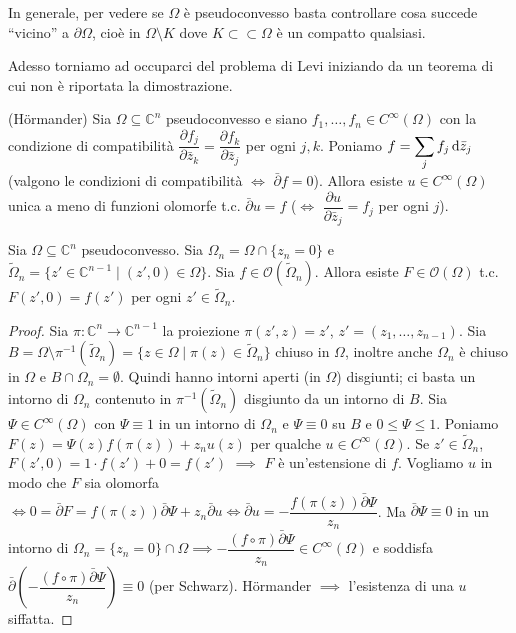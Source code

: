 \begin{oss}
  In generale, per vedere se $\Omega$ è pseudoconvesso basta controllare cosa succede ``vicino'' a $\partial\Omega$, cioè in $\Omega \setminus K$ dove $K \subset\subset \Omega$ è un compatto qualsiasi.
\end{oss}

Adesso torniamo ad occuparci del problema di Levi iniziando da un teorema di cui non è riportata la dimostrazione.

\begin{thm}
  (Hörmander) Sia $\Omega \subseteq \mathbb{C}^n$ pseudoconvesso e siano $f_1,\dots,f_n \in C^{\infty}(\Omega)$ con la condizione di compatibilità $\dfrac{\partial f_j}{\partial\bar{z}_k}=\dfrac{\partial f_k}{\partial\bar{z}_j}$ per ogni $j,k$. Poniamo $\displaystyle f=\sum_j f_j\mathop{}\!\mathrm{d}\bar{z}_j$ (valgono le condizioni di compatibilità $\iff$ $\bar{\partial}f=0$).
  Allora esiste $u \in C^{\infty}(\Omega)$ unica a meno di funzioni olomorfe t.c. $\bar{\partial}u=f$ ($\iff$ $\dfrac{\partial u}{\partial\bar{z}_j}=f_j$ per ogni $j$).
\end{thm}

\begin{thm} \label{hormanderino}
  Sia $\Omega \subseteq \mathbb{C}^n$ pseudoconvesso. Sia $\Omega_n=\Omega \cap \{z_n=0\}$ e $\tilde{\Omega}_n=\{z' \in \mathbb{C}^{n-1} \mid (z',0) \in \Omega\}$. Sia $f \in \mathcal{O}(\tilde{\Omega}_n)$.
  Allora esiste $F \in \mathcal{O}(\Omega)$ t.c. $F(z',0)=f(z')$ per ogni $z' \in \tilde{\Omega}_n$.
\end{thm}

\begin{proof}
  Sia $\pi:\mathbb{C}^n \longrightarrow \mathbb{C}^{n-1}$ la proiezione $\pi(z',z)=z'$, $z'=(z_1,\dots,z_{n-1})$. Sia $B=\Omega\setminus \pi^{-1}(\tilde{\Omega}_n)=\{z \in \Omega \mid \pi(z) \in \tilde{\Omega}_n\}$ chiuso in $\Omega$, inoltre anche $\Omega_n$ è chiuso in $\Omega$ e $B\cap\Omega_n=\emptyset$.
  Quindi hanno intorni aperti (in $\Omega$) disgiunti; ci basta un intorno di $\Omega_n$ contenuto in $\pi^{-1}(\tilde{\Omega}_n)$ disgiunto da un intorno di $B$. Sia $\Psi \in C^{\infty}(\Omega)$ con $\Psi \equiv 1$ in un intorno di $\Omega_n$ e $\Psi \equiv 0$ su $B$ e $0 \le \Psi \le 1$.
  Poniamo $F(z)=\Psi(z)f(\pi(z))+z_nu(z)$ per qualche $u \in C^{\infty}(\Omega)$. Se $z' \in \tilde{\Omega}_n$, $F(z',0)=1\cdot f(z')+0=f(z')$ $\implies$ $F$ è un'estensione di $f$.
  Vogliamo $u$ in modo che $F$ sia olomorfa $\iff 0=\bar{\partial}F=f(\pi(z))\bar{\partial}\Psi+z_n\bar{\partial}u \iff \bar{\partial}u=-\dfrac{f(\pi(z))\bar{\partial}\Psi}{z_n}$.
  Ma $\bar{\partial}\Psi \equiv 0$ in un intorno di $\Omega_n=\{z_n=0\} \cap \Omega \implies -\dfrac{(f\circ\pi)\bar{\partial}\Psi}{z_n} \in C^{\infty}(\Omega)$ e soddisfa $\bar{\partial}\left(-\dfrac{(f\circ\pi)\bar{\partial}\Psi}{z_n}\right) \equiv 0$ (per Schwarz).
  Hörmander $\implies$ l'esistenza di una $u$ siffatta.
\end{proof}

